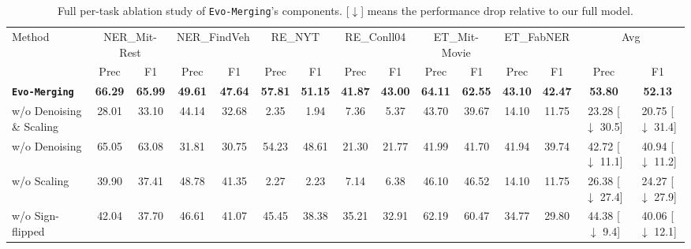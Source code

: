 \begin{table}[htbp]
\centering
\caption{Full per-task ablation study of \texttt{Evo-Merging}'s components. [$\downarrow$] means the performance drop relative to our full model.}
\vspace{-2mm}
\setlength{\tabcolsep}{0.5mm}
\begin{tabular}{lcccccccccccc cc} 
\toprule
\multirow{2}{*}{Method}  & \multicolumn{2}{c}{NER\_Mit-Rest} & \multicolumn{2}{c}{NER\_FindVeh} & \multicolumn{2}{c}{RE\_NYT} & \multicolumn{2}{c}{RE\_Conll04} & \multicolumn{2}{c}{ET\_Mit-Movie} & \multicolumn{2}{c}{ET\_FabNER} & \multicolumn{2}{c}{Avg} \\
\cmidrule(lr){2-3} \cmidrule(lr){4-5} \cmidrule(lr){6-7} \cmidrule(lr){8-9} \cmidrule(lr){10-11} \cmidrule(lr){12-13} \cmidrule(lr){14-15}
 & Prec & F1 & Prec & F1 & Prec & F1 & Prec & F1 & Prec & F1 & Prec & F1 & Prec & F1 \\
\midrule
\textbf{\texttt{Evo-Merging}} & \textbf{66.29} & \textbf{65.99} & \textbf{49.61} & \textbf{47.64} & \textbf{57.81} & \textbf{51.15} & \textbf{41.87} & \textbf{43.00} & \textbf{64.11} & \textbf{62.55} & \textbf{43.10} & \textbf{42.47} & \textbf{53.80} & \textbf{52.13} \\
\midrule
w/o Denoising \& Scaling & 28.01 & 33.10 & 44.14 & 32.68 & 2.35 & 1.94 & 7.36 & 5.37 & 43.70 & 39.67 & 14.10 & 11.75 & 23.28 [$\downarrow$ 30.5] & 20.75 [$\downarrow$ 31.4] \\
w/o Denoising & 65.05 & 63.08 & 31.81 & 30.75 & 54.23 & 48.61 & 21.30 & 21.77 & 41.99 & 41.70 & 41.94 & 39.74 & 42.72 [$\downarrow$ 11.1] & 40.94 [$\downarrow$ 11.2] \\
w/o Scaling & 39.90 & 37.41 & 48.78 & 41.35 & 2.27 & 2.23 & 7.14 & 6.38 & 46.10 & 46.52 & 14.10 & 11.75 & 26.38 [$\downarrow$ 27.4] & 24.27 [$\downarrow$ 27.9] \\
w/o Sign-flipped & 42.04 & 37.70 & 46.61 & 41.07 & 45.45 & 38.38 & 35.21 & 32.91 & 62.19 & 60.47 & 34.77 & 29.80 & 44.38 [$\downarrow$ 9.4] & 40.06 [$\downarrow$ 12.1] \\
\bottomrule
\end{tabular}
\vspace{-1mm}
\end{table}
